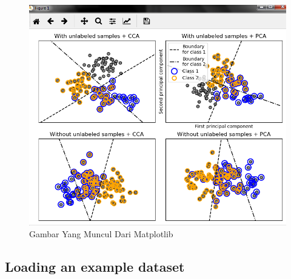 \begin{enumerate}
\begin{figure}
	\begin{center}
   	 \includegraphics[scale=0.5]{figures/hasil2.png}
   	 \caption{Gambar Yang Muncul Dari Matplotlib}	
	\end{center}
\end{figure}
\end{enumerate}

\subsection{Loading an example dataset}

